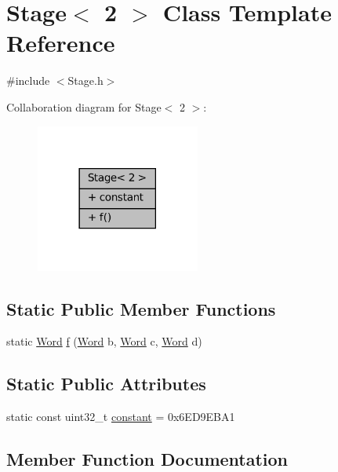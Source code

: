 \hypertarget{class_stage_3_012_01_4}{}\section{Stage$<$ 2 $>$ Class Template Reference}
\label{class_stage_3_012_01_4}


{\ttfamily \#include $<$Stage.\+h$>$}



Collaboration diagram for Stage$<$ 2 $>$\+:
\nopagebreak
\begin{figure}[H]
\begin{center}
\leavevmode
\includegraphics[width=153pt]{class_stage_3_012_01_4__coll__graph}
\end{center}
\end{figure}
\subsection*{Static Public Member Functions}
\begin{DoxyCompactItemize}
\item 
static \mbox{\hyperlink{class_word}{Word}} \mbox{\hyperlink{class_stage_3_012_01_4_ab38970587b73bc1db8a432149fffcee8}{f}} (\mbox{\hyperlink{class_word}{Word}} b, \mbox{\hyperlink{class_word}{Word}} c, \mbox{\hyperlink{class_word}{Word}} d)
\end{DoxyCompactItemize}
\subsection*{Static Public Attributes}
\begin{DoxyCompactItemize}
\item 
static const uint32\+\_\+t \mbox{\hyperlink{class_stage_3_012_01_4_acd36c94d48c66aea63f5fce216cbf3fa}{constant}} = 0x6\+E\+D9\+E\+B\+A1
\end{DoxyCompactItemize}


\subsection{Member Function Documentation}
\mbox{\label{class_stage_3_012_01_4_ab38970587b73bc1db8a432149fffcee8}} 

